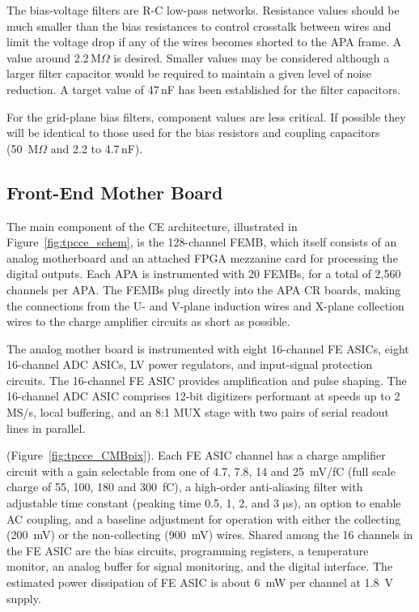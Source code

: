 The bias-voltage filters are R-C low-pass networks.
Resistance values should be much smaller than the bias resistances to control crosstalk between wires
and limit the voltage drop if any of the wires becomes shorted to the APA frame.
A value around 2.2\,M$\Omega$ is desired.
Smaller values may be considered although a larger filter capacitor would be required to maintain a given level of noise reduction.
A target value of 47\,nF has been established for the filter capacitors.

For the grid-plane bias filters, component values are less critical.
If possible they will be identical to those used for the bias resistors and coupling capacitors
(50~M$\Omega$ and 2.2 to 4.7\,nF).


\subsection{Front-End Mother Board}
\label{subsec:fe_arch}

The main component of the CE architecture, illustrated in Figure~\ref{fig:tpcce_schem}, is the 
128-channel FEMB, which itself consists of an analog motherboard and an attached FPGA 
mezzanine card for processing the digital outputs.
Each APA is instrumented with 20 FEMBs, for a total of 2,560 channels per APA.
The FEMBs plug directly into the APA CR boards, making the connections from the U- and V-plane induction wires and 
X-plane collection wires to the charge amplifier circuits as short as possible.

The analog mother board is instrumented with eight 16-channel FE ASICs,
eight 16-channel ADC ASICs, LV power regulators, and input-signal protection circuits.
The 16-channel FE ASIC provides amplification and pulse shaping.
The 16-channel ADC ASIC comprises  12-bit digitizers performant at speeds up to 2 MS/s, local buffering,
and an 8:1 MUX stage with two pairs of serial readout lines in parallel.

 
   (Figure~\ref{fig:tpcce_CMBpix}).
Each FE ASIC channel has a charge amplifier circuit with a gain selectable from one of 4.7, 7.8, 14 and 25~mV/fC
(full scale charge of 55, 100, 180 and 300~fC),
a high-order anti-aliasing filter with adjustable time
constant (peaking time 0.5, 1, 2, and 3 $\mathrm{\mu}$s),
an option to enable AC coupling,
and a baseline adjustment for operation with either the collecting (200~mV) or the non-collecting (900~mV) wires.
Shared among the 16 channels in the FE ASIC are the bias circuits, programming registers,
a temperature monitor, an analog buffer for signal monitoring, and the digital interface.
The estimated power dissipation of FE ASIC is about 6~mW per channel at 1.8~V supply.

